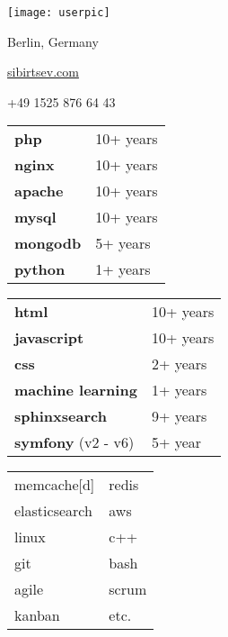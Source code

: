 \documentclass[paper=a4,fontsize=11pt]{eucv}
\begin{document}
\begin{minipage}{.2\linewidth}
   \texttt{[image: userpic]}
\end{minipage}      
\begin{minipage}{0.7\linewidth}
   \sepspace
   \noindent
   
   \hfill Berlin, Germany

   \hfill {}%
   
   \hfill \href{https://sibirtsev.com/}{sibirtsev.com}%
   
   \hfill +49 1525 876 64 43%
   
   \hfill {}%
\end{minipage}


\hspace{3mm}
\begin{minipage}[t]{0.33\textwidth} 
	
	\begin{tabular}[t]{ l l }
		\textbf{php} & 10+ years \\
		\textbf{nginx} & 10+ years \\
		\textbf{apache} & 10+ years \\
		\textbf{mysql} & 10+ years \\
		\textbf{mongodb} & 5+ years \\
		\textbf{python} & 1+ years \\
	\end{tabular}
	
	\sepspace
	
\end{minipage}
%
\begin{minipage}[t]{0.33\textwidth} 
	
	\begin{tabular}[t]{ l l }
		\textbf{html} & 10+ years \\
		\textbf{javascript} & 10+ years \\
		\textbf{css} & 2+ years \\
		\textbf{machine learning} & 1+ years \\
		\textbf{sphinxsearch} & 9+ years \\
		\textbf{symfony} (v2 - v6) & 5+ year
	\end{tabular}
	
	\sepspace
	
\end{minipage}
%
\begin{minipage}[t]{0.33\textwidth} 
	\begin{tabular}[t]{l l}
		memcache[d] & redis \\
		elasticsearch & aws \\
		linux & c++  \\
		git & bash \\
		agile & scrum  \\
		kanban & etc. \\
	\end{tabular}
\end{minipage}
\end{document}
